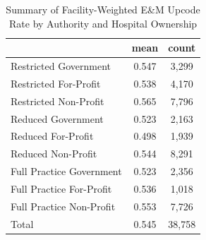 \begin{table}[htbp]\centering
\def\sym#1{\ifmmode^{#1}\else\(^{#1}\)\fi}
\caption{Summary of Facility-Weighted E\&M Upcode Rate by Authority and Hospital Ownership}
\begin{tabular}{l*{1}{cc}}
\toprule
                    &        mean&       count\\
\midrule
Restricted Government&       0.547&       3,299\\
Restricted For-Profit&       0.538&       4,170\\
Restricted Non-Profit&       0.565&       7,796\\
Reduced Government  &       0.523&       2,163\\
Reduced For-Profit  &       0.498&       1,939\\
Reduced Non-Profit  &       0.544&       8,291\\
Full Practice Government&       0.523&       2,356\\
Full Practice For-Profit&       0.536&       1,018\\
Full Practice Non-Profit&       0.553&       7,726\\
Total               &       0.545&      38,758\\
\bottomrule
\end{tabular}
\end{table}
